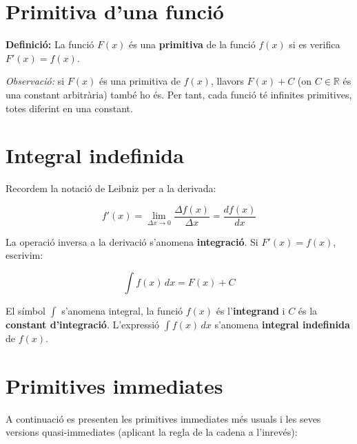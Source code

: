 \section{Primitiva d'una funció}

\textbf{Definició:} La funció $F(x)$ és una \textbf{primitiva} de la funció $f(x)$ si es verifica $F'(x) = f(x)$.

\emph{Observació:} si $F(x)$ és una primitiva de $f(x)$, llavors $F(x) + C$ (on $C \in \mathbb{R}$ és una constant arbitrària) també ho és. Per tant, cada funció té infinites primitives, totes diferint en una constant.

\section{Integral indefinida}

Recordem la notació de Leibniz per a la derivada:

\begin{equation*}
f'(x) = \lim_{\Delta x\to 0}\frac{\Delta f(x)}{\Delta x} = \frac{df(x)}{dx}
\end{equation*}

La operació inversa a la derivació s'anomena \textbf{integració}. Si $F'(x) = f(x)$, escrivim:

\begin{equation*}
\int f(x)\,dx = F(x) + C
\end{equation*}

El símbol $\int$ s'anomena integral, la funció $f(x)$ és l'\textbf{integrand} i $C$ és la \textbf{constant d'integració}. L'expressió $\int f(x)\,dx$ s'anomena \textbf{integral indefinida} de $f(x)$.

\section{Primitives immediates}

A continuació es presenten les primitives immediates més usuals i les seves versions quasi-immediates (aplicant la regla de la cadena a l'inrevés):

